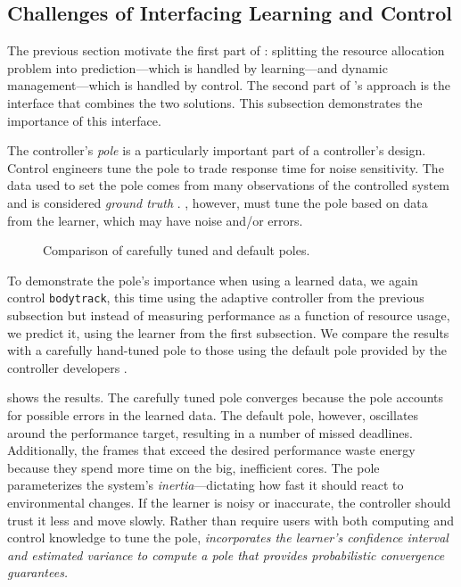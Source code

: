 \subsection{Challenges of Interfacing Learning and Control}
The previous section motivate the first part of \SYSTEM{}: splitting
the resource allocation problem into prediction---which is handled by
learning---and dynamic management---which is handled by control. The
second part of \SYSTEM{}'s approach is the interface that combines the
two solutions.  This subsection demonstrates the importance of this
interface.

The controller's \emph{pole} is a particularly important part of a
controller's design.  Control engineers tune the pole to trade
response time for noise sensitivity.  The data used to set the pole
comes from many observations of the controlled system and is
considered \emph{ground truth} \cite{Hellerstein2004a}.  \SYSTEM{},
however, must tune the pole based on data from the learner, which may
have noise and/or errors.



\begin{figure} 

\caption{Comparison of carefully tuned and default poles.}
\label{fig:not-simple}
\end{figure}
To demonstrate the pole's importance when using a learned data, we
again control \texttt{bodytrack}, this time using the adaptive
controller from the previous subsection but instead of measuring
performance as a function of resource usage, we predict it, using the
learner from the first subsection.  We compare the results with a
carefully hand-tuned pole to those using the default pole provided by
the controller developers \cite{POET}.

 shows the results.  The carefully tuned pole
converges because the pole accounts for possible errors in the learned
data. The default pole, however, oscillates around the performance
target, resulting in a number of missed deadlines.  Additionally, the
frames that exceed the desired performance waste energy because they
spend more time on the big, inefficient cores. The pole parameterizes
the system's \emph{inertia}---dictating how fast it should react to
environmental changes.  If the learner is noisy or inaccurate, the
controller should trust it less and move slowly. Rather than require
users with both computing and control knowledge to tune the pole,
\emph{\SYSTEM{} incorporates the learner's confidence interval and
  estimated variance to compute a pole that provides probabilistic
  convergence guarantees.}



